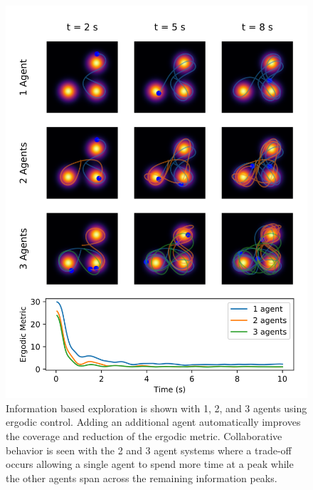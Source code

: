 \documentclass[conference]{IEEEtran}
\begin{document}
\begin{figure}[ht!]
\centering
\includegraphics[scale=0.6]{figures/n_agent_comparison2.png}
\caption{ Information based exploration is shown with 1, 2, and 3 agents using ergodic control. Adding an additional agent automatically improves the coverage and reduction of the ergodic metric. Collaborative behavior is seen with the 2 and 3 agent systems where a trade-off occurs allowing a single agent to spend more time at a peak while the other agents span across the remaining information peaks. }
\label{fig:n_agent}
\end{figure}
\end{document}
